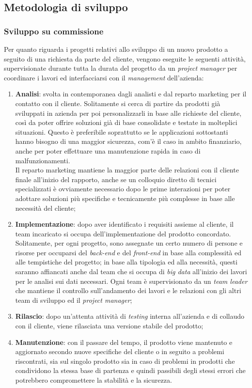 \subsection{Metodologia di sviluppo}

\subsubsection{Sviluppo su commissione} \label{commissione}
Per quanto riguarda i progetti relativi allo sviluppo di un nuovo prodotto a seguito di una richiesta da parte del cliente, vengono eseguite le seguenti attività, supervisionate durante tutta la durata del progetto da un \textit{project manager} per coordinare i lavori ed interfacciarsi con il \textit{management} dell'azienda:
\begin{enumerate}
	\item \textbf{Analisi}: svolta in contemporanea dagli analisti e dal reparto marketing per il contatto con il cliente. Solitamente si cerca di partire da prodotti già sviluppati in azienda per poi personalizzarli in base alle richieste del cliente, così da poter offrire soluzioni già di base consolidate e testate in molteplici situazioni. Questo è preferibile soprattutto se le applicazioni sottostanti hanno bisogno di una maggior sicurezza, com'è il caso in ambito finanziario, anche per poter effettuare una manutenzione rapida in caso di malfunzionamenti.\\
	Il reparto marketing mantiene la maggior parte delle relazioni con il cliente finale all'inizio del rapporto, anche se un colloquio diretto di tecnici specializzati è ovviamente necessario dopo le prime interazioni per poter adottare soluzioni più specifiche e tecnicamente più complesse in base alle necessità del cliente;
	\item \textbf{Implementazione}: dopo aver identificato i requisiti assieme al cliente, il team incaricato si occupa dell'implementazione del prodotto concordato. Solitamente, per ogni progetto, sono assegnate un certo numero di persone e risorse per occuparsi del \textit{back-end} e del \textit{front-end} in base alla complessità ed alle tempistiche del progetto; in base alla tipologia ed alla necessità, questi saranno affiancati anche dal team che si occupa di \textit{big data} all'inizio dei lavori per le analisi sui dati necessari. Ogni team è supervisionato da un \textit{team leader} che mantiene il controllo sull'andamento dei lavori e le relazioni con gli altri team di sviluppo ed il \textit{project manager};
	\item \textbf{Rilascio}: dopo un'attenta attività di \textit{testing} interna all'azienda e di collaudo con il cliente, viene rilasciata una versione stabile del prodotto;
	\item \textbf{Manutenzione}: con il passare del tempo, il prodotto viene mantenuto e aggiornato secondo nuove specifiche del cliente o in seguito a problemi riscontrati, sia sul singolo prodotto sia in caso di problemi in prodotti che condividono la stessa base di partenza e quindi passibili degli stessi errori che potrebbero compromettere la stabilità e la sicurezza.
\end{enumerate}

